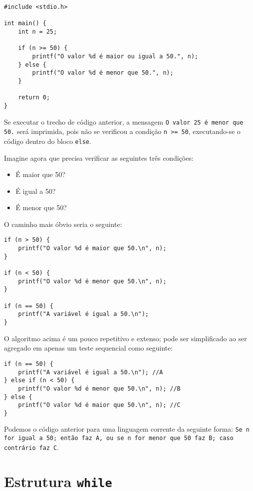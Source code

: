 \begin{lstlisting}
#include <stdio.h>  
   
int main() {      
    int n = 25;   
   
    if (n >= 50) {  
        printf("O valor %d é maior ou igual a 50.", n);  
    } else {  
        printf("O valor %d é menor que 50.", n);  
    }  
	   
    return 0;  
}  
\end{lstlisting}

Se executar o trecho de código anterior, a mensagem \texttt{O valor 25 é menor que 50.} será imprimida, pois não se verificou a condição \texttt{n >= 50}, executando-se o código dentro do bloco \texttt{else}.

Imagine agora que precisa verificar as seguintes três condições:

\begin{itemize}
\item É maior que 50?
\item É igual a 50?
\item É menor que 50?
\end{itemize}

O caminho mais óbvio seria o seguinte:

\begin{lstlisting}
if (n > 50) {  
    printf("O valor %d é maior que 50.\n", n);  
}   
   
if (n < 50) {  
    printf("O valor %d é menor que 50.\n", n);  
}  
   
if (n == 50) {  
    printf("A variável é igual a 50.\n");  
}  
\end{lstlisting}

O algoritmo acima é um pouco repetitivo e extenso; pode ser simplificado ao ser agregado em apenas um teste sequencial como seguinte:

\begin{lstlisting}
if (n == 50) {  
    printf("A variável é igual a 50.\n"); //A
} else if (n < 50) {  
    printf("O valor %d é menor que 50.\n", n); //B
} else {  
    printf("O valor %d é maior que 50.\n", n); //C  
}  
\end{lstlisting}

Podemos  o código anterior para uma linguagem corrente da seguinte forma: \texttt{Se n for igual a 50; então faz A, ou se n for menor que 50 faz B; caso contrário faz \texttt{C}}.

\section{Estrutura \texttt{while}}

